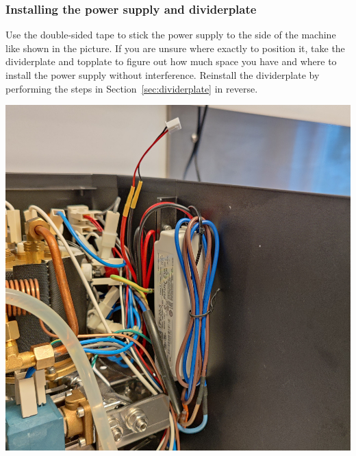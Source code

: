 \documentclass[]{article}
\begin{document}
\subsubsection{Installing the power supply and dividerplate}
\begin{minipage}[t]{0.5\linewidth}
	\vspace{0pt}
	Use the double-sided tape to stick the power supply to the side of the machine like shown in the picture. If you are unsure where exactly to position it, take the dividerplate and topplate to figure out how much space you have and where to install the power supply without interference. Reinstall the dividerplate by performing the steps in Section~\ref{sec:dividerplate} in reverse.
\end{minipage}
\hfill
\begin{minipage}[t]{0.4\linewidth}
	\vspace{0pt}
	\includegraphics[width=\linewidth]{images/03_installation/15_stick_psu_to_machine_reinstall_divider.jpg}
\end{minipage}
\end{document}
